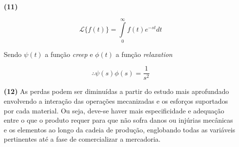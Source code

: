 \documentclass[a4paper, 12pt, brazilian]{article}
\begin{document}
\begin{itemize}
		\item[\textbf{(11)}]
		
		\begin{equation}
			\mathscr{L}\{f(t)\}=\int\limits_{0}^{\infty}f(t)e^{-st}dt
		\end{equation}
		
		Sendo $\psi(t)$ a função \textit{creep} e $\phi(t)$ a função \textit{relaxation}
		
		\begin{equation}
			\therefore\psi(s)\phi(s)=\dfrac{1}{s^{2}}
		\end{equation} 
		
		
		\item[\textbf{(12)}] As perdas podem ser diminuídas a partir do estudo mais aprofundado envolvendo a interação das operações mecanizadas e os esforços suportados por cada material. Ou seja, deve-se haver mais especificidade e adequação entre o que o produto requer para que não sofra danos ou injúrias mecânicas e os elementos ao longo da cadeia de produção, englobando todas as variáveis pertinentes até a fase de comercializar a mercadoria.
	\end{itemize} 
\end{document}
